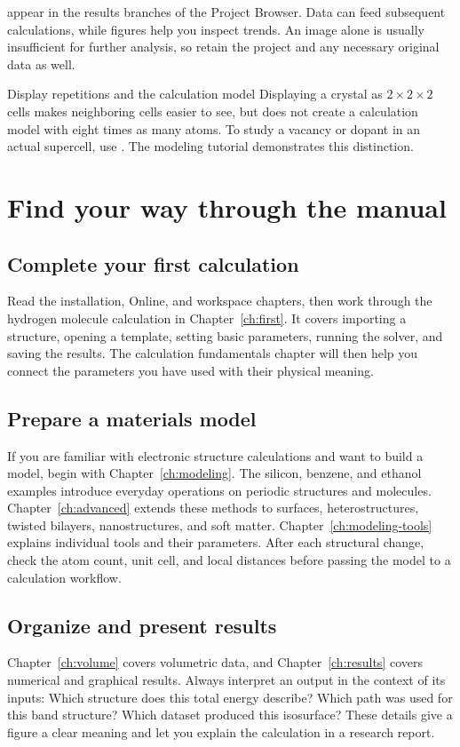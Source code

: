  appear in the results branches of the Project Browser. Data can feed subsequent calculations, while figures help you inspect trends. An image alone is usually insufficient for further analysis, so retain the project and any necessary original data as well.

\begin{notebox}{Display repetitions and the calculation model}
Displaying a crystal as $2\times2\times2$ cells makes neighboring cells easier to see, but does not create a calculation model with eight times as many atoms. To study a vacancy or dopant in an actual supercell, use . The modeling tutorial demonstrates this distinction.
\end{notebox}

\section{Find your way through the manual}
\subsection{Complete your first calculation}
Read the installation, Online, and workspace chapters, then work through the hydrogen molecule calculation in Chapter~\ref{ch:first}. It covers importing a structure, opening a template, setting basic parameters, running the solver, and saving the results. The calculation fundamentals chapter will then help you connect the parameters you have used with their physical meaning.

\subsection{Prepare a materials model}
If you are familiar with electronic structure calculations and want to build a model, begin with Chapter~\ref{ch:modeling}. The silicon, benzene, and ethanol examples introduce everyday operations on periodic structures and molecules. Chapter~\ref{ch:advanced} extends these methods to surfaces, heterostructures, twisted bilayers, nanostructures, and soft matter. Chapter~\ref{ch:modeling-tools} explains individual tools and their parameters. After each structural change, check the atom count, unit cell, and local distances before passing the model to a calculation workflow.

\subsection{Organize and present results}
Chapter~\ref{ch:volume} covers volumetric data, and Chapter~\ref{ch:results} covers numerical and graphical results. Always interpret an output in the context of its inputs: Which structure does this total energy describe? Which path was used for this band structure? Which dataset produced this isosurface? These details give a figure a clear meaning and let you explain the calculation in a research report.

